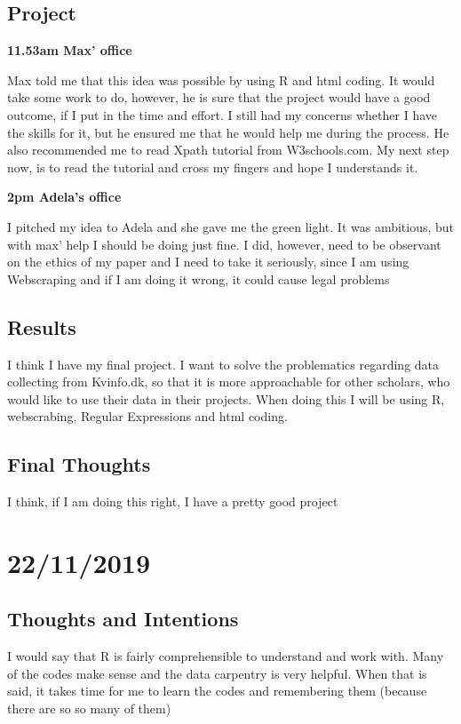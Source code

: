 \documentclass{article}
\begin{document}
\begin{itemize}
\subsection{Project}
\textbf{11.53am Max' office}

Max told me that this idea was possible by using R and html coding. It would take some work to do, however, he is sure that the project would have a good outcome, if I put in the time and effort. I still had my concerns whether I have the skills for it, but he ensured me that he would help me during the process. He also recommended me to read Xpath tutorial from W3schools.com. My next step now, is to read the tutorial and cross my fingers and hope I understands it. 

\textbf{2pm Adela's office}

I pitched my idea to Adela and she gave me the green light. It was ambitious, but with max' help I should be doing just fine. I did, however, need to be observant on the ethics of my paper and I need to take it seriously, since I am using Webscraping and if I am doing it wrong, it could cause legal problems

\subsection{Results}
I think I have my final project.
I want to solve the problematics regarding data collecting from Kvinfo.dk, so that it is more approachable for other scholars, who would like to use their data in their projects.
When doing this I will be using R, webscrabing, Regular Expressions and html coding. 

\subsection{Final Thoughts}
I think, if I am doing this right, I have a pretty good project


\section{22/11/2019}

\subsection{Thoughts and Intentions}
I would say that R is fairly comprehensible to understand and work with. Many of the codes make sense and the data carpentry is very helpful. When that is said, it takes time for me to learn the codes and remembering them (because there are so so many of them)


\end{itemize}
\end{document}
